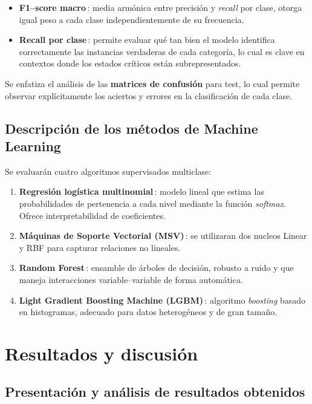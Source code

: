 \documentclass[11pt]{report}
\begin{document}
\begin{itemize}[noitemsep]
  \item \textbf{F1–score macro}\,: media armónica entre precisión y \textit{recall} por clase, otorga igual peso a cada clase independientemente de su frecuencia.
  \item \textbf{Recall por clase}\,: permite evaluar qué tan bien el modelo identifica correctamente las instancias verdaderas de cada categoría, lo cual es clave en contextos donde los estados críticos están subrepresentados.
\end{itemize}

Se enfatiza el análisis de las \textbf{matrices de confusión} para test, lo cual permite observar explícitamente los aciertos y errores en la clasificación de cada clase.



\section{Descripción de los métodos de Machine Learning}

Se evaluarán cuatro algoritmos supervisados multiclase:

\begin{enumerate}[noitemsep]
\item \textbf{Regresión logística multinomial}\,: modelo lineal que
      estima las probabilidades de pertenencia a cada nivel mediante
      la función \textit{softmax}. Ofrece interpretabilidad de
      coeficientes.
\item \textbf{Máquinas de Soporte Vectorial (MSV)}\,: se utilizaran dos nucleos Linear y RBF para capturar relaciones no lineales.
\item \textbf{Random Forest}\,: ensamble de árboles de decisión, robusto a ruido y que maneja interacciones
      variable–variable de forma automática.
\item \textbf{Light Gradient Boosting Machine (LGBM)}\,: algoritmo
      \emph{boosting} basado en histogramas, adecuado para datos heterogéneos y de gran tamaño.
\end{enumerate}

\chapter{Resultados y discusión}
\section{Presentación y análisis de resultados obtenidos}
\end{document}
